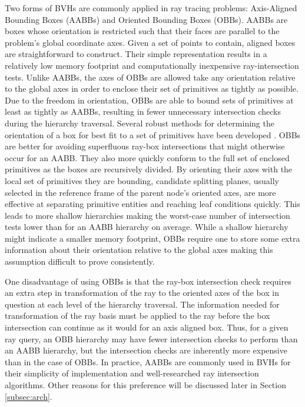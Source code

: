 Two forms of BVHs are commonly applied in ray tracing problems: Axis-Aligned
Bounding Boxes (AABBs) and Oriented Bounding Boxes (OBBs). AABBs are boxes whose
orientation is restricted such that their faces are parallel to the problem's
global coordinate axes. Given a set of points to contain, aligned boxes are
straightforward to construct. Their simple representation results in a
relatively low memory footprint and computationally inexpensive ray-intersection
tests. Unlike AABBs, the axes of OBBs are allowed take any orientation relative
to the global axes in order to enclose their set of primitives as tightly as
possible. Due to the freedom in orientation, OBBs are able to bound sets of
primitives at least as tightly as AABBs, resulting in fewer unnecessary
intersection checks during the hierarchy traversal. Several robust methods for
determining the orientation of a box for best fit to a set of primitives have
been developed \cite{Gottschalk_1996,ORourke_1985}. OBBs are better for avoiding
superfluous ray-box intersections that might otherwise occur for an AABB. They
also more quickly conform to the full set of enclosed primitives as the boxes
are recursively divided. By orienting their axes with the local set of
primitives they are bounding, candidate splitting planes, usually selected in
the reference frame of the parent node's oriented axes, are more effective at
separating primitive entities and reaching leaf conditions quickly. This leads
to more shallow hierarchies making the worst-case number of intersection tests
lower than for an AABB hierarchy on average. While a shallow hierarchy might
indicate a smaller memory footprint, OBBs require one to store some extra
information about their orientation relative to the global axes making this
assumption difficult to prove consistently.

One disadvantage of using OBBs is that the ray-box intersection check requires
an extra step in transformation of the ray to the oriented axes of the box in
question at each level of the hierarchy traversal. The information needed for
transformation of the ray basis must be applied to the ray before the box
intersection can continue as it would for an axis aligned box. Thus, for a given
ray query, an OBB hierarchy may have fewer intersection checks to perform than
an AABB hierarchy, but the intersection checks are inherently more expensive
than in the case of OBBs. In practice, AABBs are commonly used in BVHs for their
simplicity of implementation and well-researched ray intersection
algorithms. Other reasons for this preference will be discussed later in Section
\ref{subsec:arch}.

